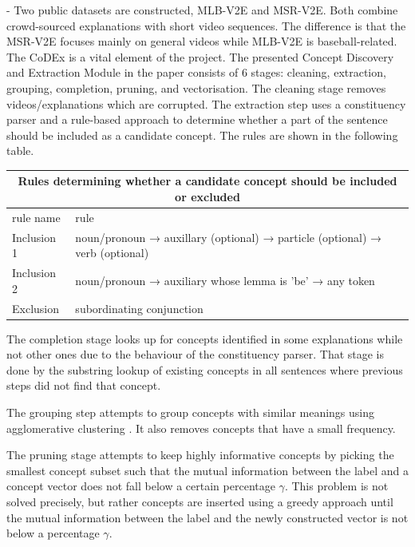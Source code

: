  - Two public datasets are constructed, MLB-V2E and MSR-V2E. Both combine crowd-sourced explanations with short video sequences. The difference is that the MSR-V2E focuses mainly on general videos while MLB-V2E is baseball-related.
\\

The CoDEx is a vital element of the project.
The presented Concept Discovery and Extraction Module in the paper consists of 6 stages: cleaning, extraction, grouping, completion, pruning, and vectorisation.
The cleaning stage removes videos/explanations which are corrupted.
The extraction step uses a constituency parser and a rule-based approach to determine whether a part of the sentence  should be included as a candidate concept. 
The rules are shown in the following table.

\begin{center}
\begin{tabular}{ |p{2cm}|p{12cm}|  }
 \hline
 \multicolumn{2}{|c|}{Rules determining whether a candidate concept should be included or excluded} \\
 \hline
 rule name & rule \\
 \hline
 Inclusion 1 & noun/pronoun → auxillary (optional) → particle (optional) → verb (optional) \\
 Inclusion 2 & noun/pronoun → auxiliary whose lemma is 'be' → any token \\
 Exclusion & subordinating conjunction \\
 
 \hline
 
\end{tabular}
\label{inclusion-exclusion-rules}
\end{center}

The completion stage looks up for concepts identified in some explanations while not other ones due to the behaviour of the constituency parser.
That stage is done by the substring lookup of existing concepts in all sentences where previous steps did not find that concept.

The grouping step attempts to group concepts with similar meanings using agglomerative clustering \cite{RefWorks:RefID:13-mullner2011modern}. 
It also removes concepts that have a small frequency.

The pruning stage attempts to keep highly informative concepts by picking the smallest concept subset such that the mutual information \cite{RefWorks:RefID:30-mackay2004information} between the label and a concept vector does not fall below a certain percentage $\gamma$.
This problem is not solved precisely, but rather concepts are inserted using a greedy approach until the mutual information between the label and the newly constructed vector is not below a percentage $\gamma$.


